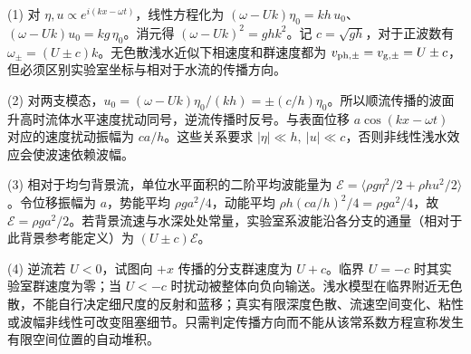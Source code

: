 (1) 对 \(\eta,u\propto e^{i(kx-\omega t)}\)，线性方程化为 \((\omega-Uk)\eta_0=kh\,u_0\)、\((\omega-Uk)u_0=kg\,\eta_0\)。消元得 \((\omega-Uk)^2=ghk^2\)。记 \(c=\sqrt{gh}\)，对于正波数有 \(\omega_\pm=(U\pm c)k\)。无色散浅水近似下相速度和群速度都为 \(v_{\rm ph,\pm}=v_{\rm g,\pm}=U\pm c\)，但必须区别实验室坐标与相对于水流的传播方向。

(2) 对两支模态，\(u_0=(\omega-Uk)\eta_0/(kh)=\pm(c/h)\eta_0\)。所以顺流传播的波面升高时流体水平速度扰动同号，逆流传播时反号。与表面位移 \(a\cos(kx-\omega t)\) 对应的速度扰动振幅为 \(c a/h\)。这些关系要求 \(|\eta|\ll h,\ |u|\ll c\)，否则非线性浅水效应会使波速依赖波幅。

(3) 相对于均匀背景流，单位水平面积的二阶平均波能量为 \(\mathcal E=\langle\rho g\eta^2/2+\rho h u^2/2\rangle\)。令位移振幅为 \(a\)，势能平均 \(\rho ga^2/4\)，动能平均 \(\rho h(ca/h)^2/4=\rho ga^2/4\)，故 \(\mathcal E=\rho ga^2/2\)。若背景流速与水深处处常量，实验室系波能沿各分支的通量（相对于此背景参考能定义）为 \((U\pm c)\mathcal E\)。

(4) 逆流若 \(U<0\)，试图向 \(+x\) 传播的分支群速度为 \(U+c\)。临界 \(U=-c\) 时其实验室群速度为零；当 \(U<-c\) 时扰动被整体向负向输送。浅水模型在临界附近无色散，不能自行决定细尺度的反射和蓝移；真实有限深度色散、流速空间变化、粘性或波幅非线性可改变阻塞细节。只需判定传播方向而不能从该常系数方程宣称发生有限空间位置的自动堆积。
